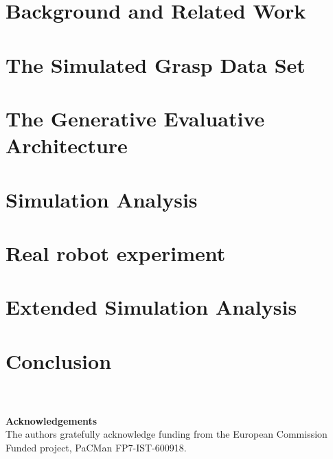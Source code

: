 \documentclass{ws-ijhr}
\begin{document}


\section{Background and Related Work}



\section{The Simulated Grasp Data Set}
\label{section:simulation}


\section{The Generative Evaluative Architecture} \label{section:evaluative}


\section{Simulation Analysis}
\label{section:simulationAnalysis}


\section{Real robot experiment}
\label{section:experiments}


\section{Extended Simulation Analysis}
\label{section:extendedSimulationAnalysis}


\section{Conclusion} 
\label{sec:conclusion}

\\\\
\noindent
\textbf{Acknowledgements}\\
The authors gratefully acknowledge funding from the European Commission Funded project, PaCMan FP7-IST-600918.

\end{document}
